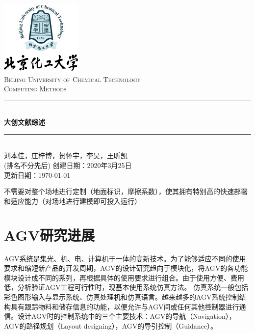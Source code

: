 \documentclass[cs4size,a4paper]{ctexart}
\numberwithin{equation}{section}
\numberwithin{table}{section}
\numberwithin{figure}{section}
\newcommand{\HRule}{\rule{\linewidth}{0.5mm}}
\begin{document}
\newtheorem{example}{例}              	%
\newtheorem{algorithem}{算法}	
\newtheorem{theorem}{定理}            	%
\newtheorem{definition}{定义}
\newtheorem{axiom}{公理}
\newtheorem{property}{性质}
\newtheorem{proposition}{命题}
\newtheorem{lemma}{引理}
\newtheorem{corollary}{推论}
\newtheorem{remark}{注解}
\newtheorem{condition}{条件}
\newtheorem{conclusion}{结论}
\newtheorem{assumption}{假设}
\renewcommand{\contentsname}{目录}     
\renewcommand{\abstractname}{摘要} 
\renewcommand{\refname}{参考文献}     
\renewcommand{\indexname}{索引}
\renewcommand{\figurename}{图}
\renewcommand{\tablename}{表}
\renewcommand{\appendixname}{附录}
\renewcommand{\proofname}{证明}
\renewcommand\emph[1]{\textcolor{black}{\textbf{#1}}}
\begin{titlepage}
\begin{center}
\includegraphics[width=0.30\textwidth]{logo}\\[1cm]    
\textsc{\Large Beijing University of Chemical Technology}\\[1.0cm]
\textsc{\Large Computing Methods}\\[0.5cm]
\HRule \\[0.8cm]
{\huge \bfseries 大创文献综述}\\[0.4cm]
\HRule \\[0.7cm]
\textsc{刘本佳，庄梓博，贺怀宇，李昊，王昕凯\\(排名不分先后)}
\tableofcontents 
\vfill
{创建日期：2020年3月25日}\\
{更新日期：\today}
\end{center}
\end{titlepage}
\pagestyle{plain}
\thispagestyle{empty}
\pagestyle{fancy}

\abstract
不需要对整个场地进行定制（地面标识，摩擦系数），使其拥有特别高的快速部署和适应能力（对场地进行建模即可投入运行）
\section{AGV研究进展}
AGV系统是集光、机、电、计算机于一体的高新技术。为了能够适应不同的使用要求和缩短新产品的开发周期，AGV的设计研究趋向于模块化，将AGV的各功能模块设计成不同的系列，再根据具体的使用要求进行组合。由于使用方便、费用低，分析验证AGV工程可行性时，现基本使用系统仿真方法。
仿真系统一般包括彩色图形输入与显示系统、仿真处理机和仿真语言。越来越多的AGV系统控制结构具有跟踪物料和储存信息的功能，以便允许与AGV间或任何其他控制器进行通信。设计AGV时的控制系统中的三个主要技术：AGV的导航（Navigation），AGV的路径规划（Layout designing），AGV的导引控制（Guidance）。
\end{document}
